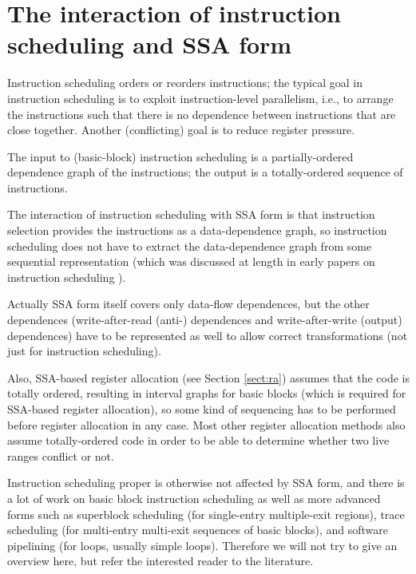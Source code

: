 \chapter{The interaction of instruction scheduling and SSA form }
%

Instruction scheduling orders or reorders instructions; the typical
goal in instruction scheduling is to exploit instruction-level
parallelism, i.e., to arrange the instructions such that there is no
dependence between instructions that are close together.  Another
(conflicting) goal is to reduce register pressure.

The input to (basic-block) instruction scheduling is a
partially-ordered dependence graph of the instructions; the output is
a totally-ordered sequence of instructions.

The interaction of instruction scheduling with SSA form is that
instruction selection provides the instructions as a data-dependence
graph, so instruction scheduling does not have to extract the
data-dependence graph from some sequential representation (which was
discussed at length in early papers on instruction scheduling
\cite{...}).

Actually SSA form itself covers only data-flow dependences, but the
other dependences (write-after-read (anti-) dependences and
write-after-write (output) dependences) have to be represented as well
to allow correct transformations (not just for instruction
scheduling).

Also, SSA-based register allocation (see Section \ref{sect:ra})
assumes that the code is totally ordered, resulting in interval graphs
for basic blocks (which is required for SSA-based register
allocation), so some kind of sequencing has to be performed before
register allocation in any case.  Most other register allocation
methods also assume totally-ordered code in order to be able to
determine whether two live ranges conflict or not.

Instruction scheduling proper is otherwise not affected by SSA form,
and there is a lot of work on basic block instruction scheduling
\cite{...} as well as more advanced forms such as superblock
scheduling \cite{...} (for single-entry multiple-exit regions), trace
scheduling \cite{...} (for multi-entry multi-exit sequences of basic
blocks), and software pipelining \cite{...} (for loops, usually simple
loops).  Therefore we will not try to give an overview here, but refer
the interested reader to the literature.
